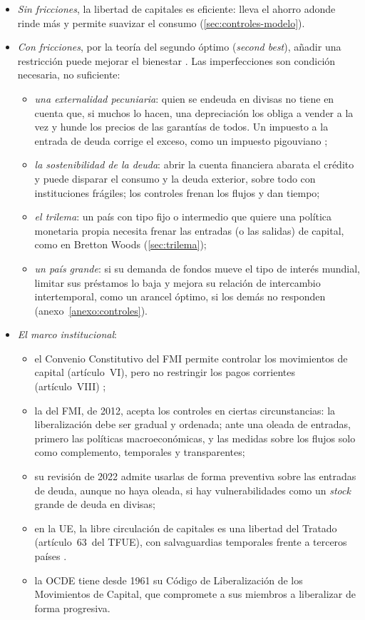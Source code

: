 \documentclass[11pt]{article}
\begin{document}
\begin{itemize}
\item \emph{Sin fricciones}, la libertad de capitales es eficiente: lleva el ahorro adonde rinde más y permite suavizar el consumo (\ref{sec:controles-modelo}).
\item \emph{Con fricciones}, por la teoría del segundo óptimo (\emph{second best}), añadir una restricción puede mejorar el bienestar . Las imperfecciones son condición necesaria, no suficiente:
  \begin{itemize}
  \item \emph{una externalidad pecuniaria}: quien se endeuda en divisas no tiene en cuenta que, si muchos lo hacen, una depreciación los obliga a vender a la vez y hunde los precios de las garantías de todos. Un impuesto a la entrada de deuda corrige el exceso, como un impuesto pigouviano\nocite{Korinek2011New}  ;
  \item \emph{la sostenibilidad de la deuda}: abrir la cuenta financiera abarata el crédito y puede disparar el consumo y la deuda exterior, sobre todo con instituciones frágiles; los controles frenan los flujos y dan tiempo;
  \item \emph{el trilema}: un país con tipo fijo o intermedio que quiere una política monetaria propia necesita frenar las entradas (o las salidas) de capital, como en Bretton Woods (\ref{sec:trilema});
  \item \emph{un país grande}: si su demanda de fondos mueve el tipo de interés mundial, limitar sus préstamos lo baja y mejora su relación de intercambio intertemporal, como un arancel óptimo, si los demás no responden (anexo~\ref{anexo:controles}).
  \end{itemize}
\item \emph{El marco institucional}:
  \begin{itemize}
  \item el Convenio Constitutivo del FMI permite controlar los movimientos de capital (artículo~VI), pero no restringir los pagos corrientes (artículo~VIII) ;
  \item la  del FMI, de 2012, acepta los controles en ciertas circunstancias: la liberalización debe ser gradual y ordenada; ante una oleada de entradas, primero las políticas macroeconómicas, y las medidas sobre los flujos solo como complemento, temporales y transparentes\nocite{FMI2012VisionInstitucional};
  \item su revisión de 2022 admite usarlas de forma preventiva sobre las entradas de deuda, aunque no haya oleada, si hay vulnerabilidades como un \emph{stock} grande de deuda en divisas\nocite{FMI2022RevisionVI};
  \item en la UE, la libre circulación de capitales es una libertad del Tratado (artículo~63~del TFUE), con salvaguardias temporales frente a terceros países .
  \item la OCDE tiene desde 1961 su Código de Liberalización de los Movimientos de Capital, que compromete a sus miembros a liberalizar de forma progresiva.
  \end{itemize}
\end{itemize}
\end{document}
